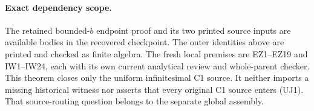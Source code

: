 \paragraph{Exact dependency scope.}
The retained bounded-$b$ endpoint proof and its two printed source
inputs are available bodies in the recovered checkpoint. The
outer identities above are printed and checked as finite algebra.
The fresh local premises are EZ1--EZ19 and IW1--IW24, each with
its own current analytical review and whole-parent checker.
This theorem closes only the uniform infinitesimal C1 source.
It neither imports a missing historical witness nor asserts that
every original C1 source enters (UJ1). That source-routing
question belongs to the separate global assembly.
